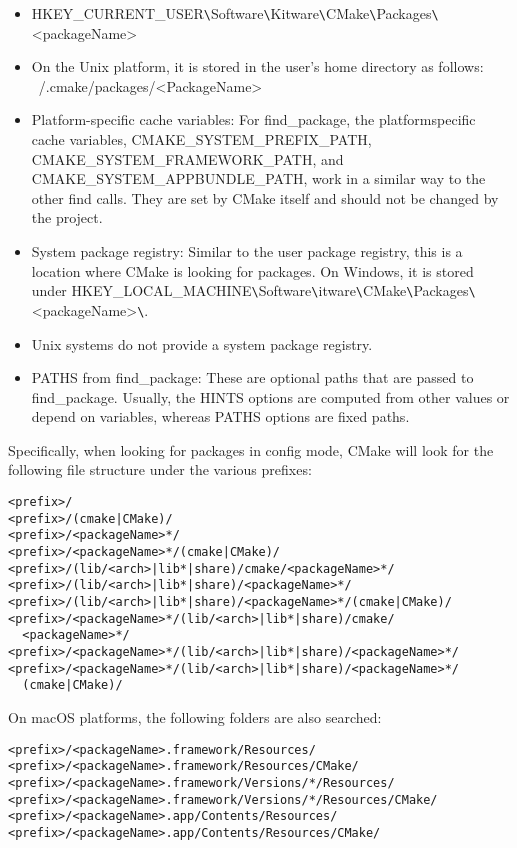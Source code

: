 \begin{itemize}
\item 
HKEY\_CURRENT\_USER\verb|\|Software\verb|\|Kitware\verb|\|CMake\verb|\|Packages\verb|\|<packageName>\

\item 
On the Unix platform, it is stored in the user's home directory as follows: ~/.cmake/packages/<PackageName>

\item 
Platform-specific cache variables: For find\_package, the platformspecific cache variables, CMAKE\_SYSTEM\_PREFIX\_PATH, CMAKE\_SYSTEM\_FRAMEWORK\_PATH, and CMAKE\_SYSTEM\_APPBUNDLE\_PATH, work in a similar way to the other find calls. They are set by CMake itself and should not be changed by the project.

\item 
System package registry: Similar to the user package registry, this is a location where CMake is looking for packages. On Windows, it is stored under HKEY\_LOCAL\_MACHINE\verb|\|Software\verb|\|itware\verb|\|CMake\verb|\|Packages\verb|\|<packageName>\verb|\|.

\item 
Unix systems do not provide a system package registry.

\item 
PATHS from find\_package: These are optional paths that are passed to find\_package. Usually, the HINTS options are computed from other values or depend on variables, whereas PATHS options are fixed paths.
\end{itemize}

Specifically, when looking for packages in config mode, CMake will look for the following file structure under the various prefixes:

\begin{lstlisting}[style=styleCMake]
<prefix>/
<prefix>/(cmake|CMake)/
<prefix>/<packageName>*/
<prefix>/<packageName>*/(cmake|CMake)/
<prefix>/(lib/<arch>|lib*|share)/cmake/<packageName>*/
<prefix>/(lib/<arch>|lib*|share)/<packageName>*/
<prefix>/(lib/<arch>|lib*|share)/<packageName>*/(cmake|CMake)/
<prefix>/<packageName>*/(lib/<arch>|lib*|share)/cmake/
  <packageName>*/
<prefix>/<packageName>*/(lib/<arch>|lib*|share)/<packageName>*/
<prefix>/<packageName>*/(lib/<arch>|lib*|share)/<packageName>*/
  (cmake|CMake)/
\end{lstlisting}

On macOS platforms, the following folders are also searched:

\begin{lstlisting}[style=styleCMake]
<prefix>/<packageName>.framework/Resources/
<prefix>/<packageName>.framework/Resources/CMake/
<prefix>/<packageName>.framework/Versions/*/Resources/
<prefix>/<packageName>.framework/Versions/*/Resources/CMake/
<prefix>/<packageName>.app/Contents/Resources/
<prefix>/<packageName>.app/Contents/Resources/CMake/
\end{lstlisting}

